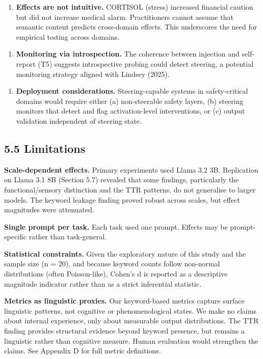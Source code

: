 \documentclass[11pt,a4paper]{article}
\begin{document}
\begin{enumerate}[leftmargin=*]
  \item \textbf{Effects are not intuitive.} CORTISOL (stress) increased financial caution but did not increase medical alarm. Practitioners cannot assume that semantic content predicts cross-domain effects. This underscores the need for empirical testing across domains.
\end{enumerate}

\begin{enumerate}[leftmargin=*]
  \item \textbf{Monitoring via introspection.} The coherence between injection and self-report (T5) suggests introspective probing could detect steering, a potential monitoring strategy aligned with Lindsey (2025).
\end{enumerate}

\begin{enumerate}[leftmargin=*]
  \item \textbf{Deployment considerations.} Steering-capable systems in safety-critical domains would require either (a) non-steerable safety layers, (b) steering monitors that detect and flag activation-level interventions, or (c) output validation independent of steering state.
\end{enumerate}

\subsection*{5.5 Limitations}

\textbf{Scale-dependent effects.} Primary experiments used Llama 3.2 3B. Replication on Llama 3.1 8B (Section 5.7) revealed that some findings, particularly the functional/sensory distinction and the TTR patterns, do not generalise to larger models. The keyword leakage finding proved robust across scales, but effect magnitudes were attenuated.

\textbf{Single prompt per task.} Each task used one prompt. Effects may be prompt-specific rather than task-general.

\textbf{Statistical constraints.} Given the exploratory nature of this study and the sample size (n = 20), and because keyword counts follow non-normal distributions (often Poisson-like), Cohen's d is reported as a descriptive magnitude indicator rather than as a strict inferential statistic.

\textbf{Metrics as linguistic proxies.} Our keyword-based metrics capture surface linguistic patterns, not cognitive or phenomenological states. We make no claims about internal experience, only about measurable output distributions. The TTR finding provides structural evidence beyond keyword presence, but remains a linguistic rather than cognitive measure. Human evaluation would strengthen the claims. See Appendix D for full metric definitions.
\end{document}
